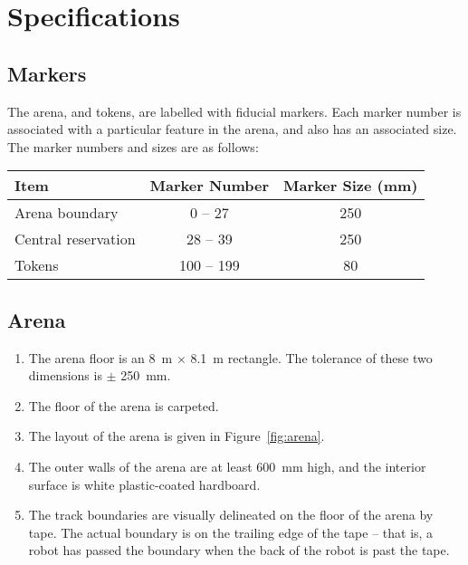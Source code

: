 \section{Specifications}
\label{sec:specs}

\subsection{Markers}
\label{spec:markers}

The arena, and tokens, are labelled with fiducial markers. Each
marker number is associated with a particular feature in the arena,
and also has an associated size.  The marker numbers and sizes are
as follows:

\begin{center}
\begin{tabular}{lcc}
  \toprule
  \textbf{Item} & \textbf{Marker Number} & \textbf{Marker Size (\si{mm})} \\
  \midrule
  Arena boundary & 0 -- 27 & 250 \\
  Central reservation & 28 -- 39 & 250  \\
  Tokens & 100 -- 199 & 80 \\
  \bottomrule
\end{tabular}
\end{center}

\subsection{Arena}
\label{spec:arena}

\begin{enumerate}
  \item The arena floor is an \SI{8}{m} $\times$ \SI{8.1}{m} rectangle. The
        tolerance of these two dimensions is $\pm$ \SI{250}{mm}.
  \item The floor of the arena is carpeted.
  \item The layout of the arena is given in Figure~\ref{fig:arena}.
  \item The outer walls of the arena are at least \SI{600}{mm} high, and the
        interior surface is white plastic-coated hardboard.
  \item The track boundaries are visually delineated on the floor of the arena
        by tape. The actual boundary is on the trailing edge of the tape --
        that is, a robot has passed the boundary when the back of the robot
        is past the tape.
\end{enumerate}

